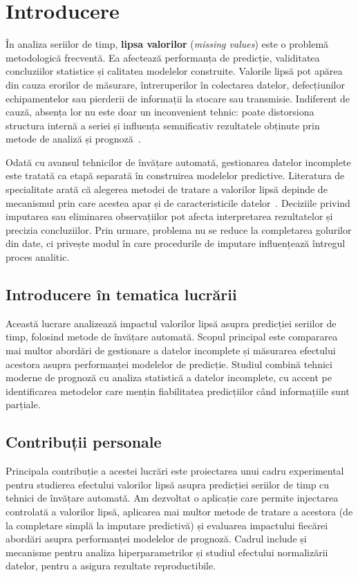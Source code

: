 \chapter{Introducere}

În analiza seriilor de timp, \textbf{lipsa valorilor} (\textit{missing values}) este o problemă metodologică frecventă. Ea afectează performanța de predicție, validitatea concluziilor statistice și calitatea modelelor construite. Valorile lipsă pot apărea din cauza erorilor de măsurare, întreruperilor în colectarea datelor, defecțiunilor echipamentelor sau pierderii de informații la stocare sau transmisie. Indiferent de cauză, absența lor nu este doar un inconvenient tehnic: poate distorsiona structura internă a seriei și influența semnificativ rezultatele obținute prin metode de analiză și prognoză~\cite{acock2005missing, rubin1976inference, little2002missing}.

Odată cu avansul tehnicilor de învățare automată, gestionarea datelor incomplete este tratată ca etapă separată în construirea modelelor predictive. Literatura de specialitate arată că alegerea metodei de tratare a valorilor lipsă depinde de mecanismul prin care acestea apar și de caracteristicile datelor~\cite{rubin1976inference, little2002missing, schafer2002missing}.
Deciziile privind imputarea sau eliminarea observațiilor pot afecta interpretarea rezultatelor și precizia concluziilor. Prin urmare, problema nu se reduce la completarea golurilor din date, ci privește modul în care procedurile de imputare influențează întregul proces analitic.

\section{Introducere în tematica lucrării}

Această lucrare analizează impactul valorilor lipsă asupra predicției seriilor de timp, folosind metode de învățare automată. Scopul principal este compararea mai multor abordări de gestionare a datelor incomplete și măsurarea efectului acestora asupra performanței modelelor de predicție. Studiul combină tehnici moderne de prognoză cu analiza statistică a datelor incomplete, cu accent pe identificarea metodelor care mențin fiabilitatea predicțiilor când informațiile sunt parțiale.
\section{Contribuții personale}

Principala contribuție a acestei lucrări este proiectarea unui cadru experimental pentru studierea efectului valorilor lipsă asupra predicției seriilor de timp cu tehnici de învățare automată. Am dezvoltat o aplicație care permite injectarea controlată a valorilor lipsă, aplicarea mai multor metode de tratare a acestora (de la completare simplă la imputare predictivă) și evaluarea impactului fiecărei abordări asupra performanței modelelor de prognoză. Cadrul include și mecanisme pentru analiza hiperparametrilor și studiul efectului normalizării datelor, pentru a asigura rezultate reproductibile.

